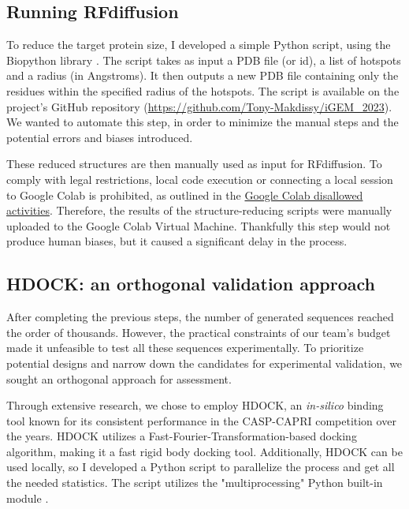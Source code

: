 \documentclass[11pt,a4paper]{article}
\begin{document}
\subsection{Running RFdiffusion}

To reduce the target protein size, I developed a simple Python script, using the Biopython library \cite{biopython}. The script takes as input a PDB file (or id), a list of hotspots and a radius (in Angstroms). It then outputs a new PDB file containing only the residues within the specified radius of the hotspots. The script is available on the project's GitHub repository (\url{https://github.com/Tony-Makdissy/iGEM_2023}). We wanted to automate this step, in order to minimize the manual steps and the potential errors and biases introduced.

These reduced structures are then manually used as input for RFdiffusion. To comply with legal restrictions, local code execution or connecting a local session to Google Colab is prohibited, as outlined in the \href{https://research.google.com/colaboratory/faq.html#disallowed-activities}{Google Colab disallowed activities}. Therefore, the results of the structure-reducing scripts were manually uploaded to the Google Colab Virtual Machine. Thankfully this step would not produce human biases, but it caused a significant delay in the process.

\subsection{HDOCK: an orthogonal validation approach}

After completing the previous steps, the number of generated sequences reached the order of thousands. However, the practical constraints of our team's budget made it unfeasible to test all these sequences experimentally. To prioritize potential designs and narrow down the candidates for experimental validation, we sought an orthogonal approach for assessment.

Through extensive research, we chose to employ HDOCK, an \emph{in-silico} binding tool \cite{yan2017hdock} known for its consistent performance in the CASP-CAPRI \cite{casp-capri} competition over the years. HDOCK utilizes a Fast-Fourier-Transformation-based docking algorithm, making it a fast rigid body docking tool. Additionally, HDOCK can be used locally, so I developed a Python script to parallelize the process and get all the needed statistics. The script utilizes the "multiprocessing" Python built-in module \cite{python_multiprocessing}.
\end{document}
